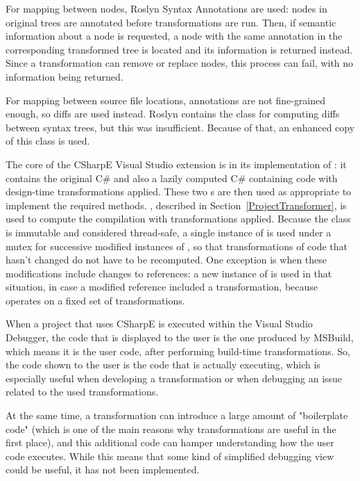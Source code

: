 For mapping between nodes, Roslyn Syntax Annotations are used: nodes in original trees are annotated before transformations are run. Then, if semantic information about a node is requested, a node with the same annotation in the corresponding transformed tree is located and its information is returned instead. Since a transformation can remove or replace nodes, this process can fail, with no information being returned.

For mapping between source file locations, annotations are not fine-grained enough, so diffs are used instead. Roslyn contains the  class for computing diffs between syntax trees, but this was insufficient. Because of that, an enhanced copy of this class is used.

\medskip

The core of the CSharpE Visual Studio extension is in its implementation of : it contains the original C\#  and also a lazily computed C\#  containing code with design-time transformations applied. These two s are then used as appropriate to implement the required  methods. , described in Section~\ref{ProjectTransformer}, is used to compute the compilation with transformations applied. Because the  class is immutable and considered thread-safe, a single instance of  is used under a mutex for successive modified instances of , so that transformations of code that hasn't changed do not have to be recomputed. One exception is when these modifications include changes to references: a new instance of  is used in that situation, in case a modified reference included a transformation, because  operates on a fixed set of transformations.

\medskip

When a project that uses CSharpE is executed within the Visual Studio Debugger, the code that is displayed to the user is the one produced by MSBuild, which means it is the user code, after performing build-time transformations. So, the code shown to the user is the code that is actually executing, which is especially useful when developing a transformation or when debugging an issue related to the used transformations.

At the same time, a transformation can introduce a large amount of "boilerplate code" (which is one of the main reasons why transformations are useful in the first place), and this additional code can hamper understanding how the user code executes. While this means that some kind of simplified debugging view could be useful, it has not been implemented.

